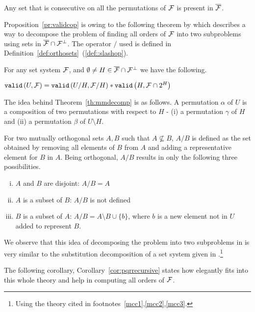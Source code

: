 \begin{proposition}
  \label{pr:validcop}
  Any set that is consecutive on all the \COP permutations of ${\cal F}$ is
  present in $\overline{{\cal F}}$.
\end{proposition}

Proposition~\ref{pr:validcop} is owing to the following theorem by
which \cite{mm96} describes a way to decompose the problem of finding
all \COP orders of ${\cal F}$ into two subproblems using sets in
$\overline{{\cal F}} \cap {\cal F}^{\bot}$. The operator $/$ used is defined in
Definition~\ref{def:orthosets}~(\ref{def::slashop}).

\begin{theoremsansproof}[{\cite[Th.~7]{mm96}}]
  \label{th:mmdecomp}
  For any set system ${\cal F}$, and $\emptyset \ne H \in \overline{{\cal F}}
  \cap {\cal F}^{\bot}$ we have the following.\par
  \centering
  ${\tt valid}\left(U,{\cal F}\right) = {\tt valid}\left(U/H,{\cal F}/H\right) * {\tt valid}\left(H,{\cal F} \cap 2^H\right)$
\end{theoremsansproof}


\def \ff {\overline{\cF} \cap \cF^{\bot}}
The idea behind Theorem~\ref{th:mmdecomp} is as follows. A permutation $\alpha$
of $U$ is a composition of two permutations with respect to $H$ - (i) a
permutation $\gamma$ of $H$ and (ii) a permutation $\beta$ of $U
\setminus H$.

For two mutually orthogonal sets $A, B$ such that $A \nsubseteq B$,
$A/B$ is defined as the set obtained by removing all elements of $B$
from $A$ and adding a representative element for $B$ in $A$. Being orthogonal,
$A/B$ results in only the following three possibilities.
\begin{enumerate}[i. ]
\item $A$ and $ B$ are disjoint: $A/B  = A$
\item $A$ is a subset of $B$: $A/B$ is not defined
\item $B$ is a subset of $A$: $A/B = A \setminus B \cup \{b\}$, where $b$
is a new element not in $U$ added to represent $B$.
\end{enumerate}

We observe that this idea of decomposing the \COP problem into two
subproblems in \cite{mm96} is very similar to the substitution
decomposition of a set system given in \cite[Sec.~4]{mcc04}.\footnote{Using
  the theory cited in footnotes~\ref{mcc1},\ref{mcc2},\ref{mcc3}.}

The following corollary, Corollary~\ref{cor:pqrrecursive} states how
\PQRtree elegantly fits into this whole theory and help in computing
all \COP orders of ${\cal F}$.

